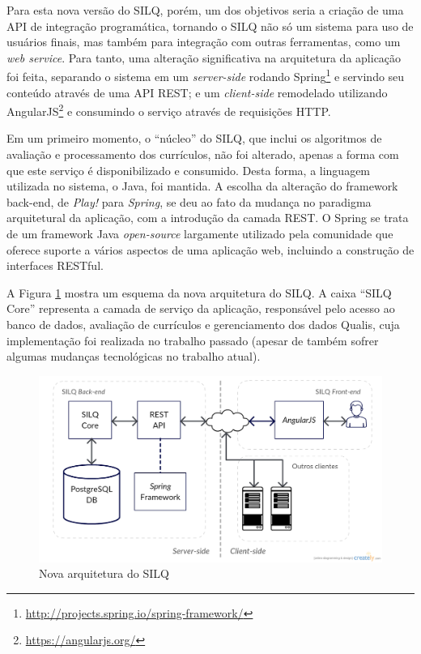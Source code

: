 \documentclass[12pt]{article}
\newcommand{\quotes}[1]{``#1''}
\begin{document}
Para esta nova versão do SILQ, porém, um dos objetivos seria a criação de uma API de integração programática, tornando o SILQ não só um sistema para uso de usuários finais, mas também para integração com outras ferramentas, como um \textit{web service}. Para tanto, uma alteração significativa na arquitetura da aplicação foi feita, separando o sistema em um \textit{server-side} rodando Spring\footnote{\url{http://projects.spring.io/spring-framework/}} e servindo seu conteúdo através de uma API REST; e um \textit{client-side} remodelado utilizando AngularJS\footnote{\url{https://angularjs.org/}} e consumindo o serviço através de requisições HTTP.

Em um primeiro momento, o \quotes{núcleo} do SILQ, que inclui os algoritmos de avaliação e processamento dos currículos, não foi alterado, apenas a forma com que este serviço é disponibilizado e consumido. Desta forma, a linguagem utilizada no sistema, o Java, foi mantida. A escolha da alteração do framework back-end, de \textit{Play!} para \textit{Spring}, se deu ao fato da mudança no paradigma arquitetural da aplicação, com a introdução da camada REST. O Spring se trata de um framework Java \textit{open-source} largamente utilizado pela comunidade que oferece suporte a vários aspectos de uma aplicação web, incluindo a construção de interfaces RESTful.

A Figura \ref{fig:arquitetura} mostra um esquema da nova arquitetura do SILQ. A caixa \quotes{SILQ Core} representa a camada de serviço da aplicação, responsável pelo acesso ao banco de dados, avaliação de currículos e gerenciamento dos dados Qualis, cuja implementação foi realizada no trabalho passado (apesar de também sofrer algumas mudanças tecnológicas no trabalho atual).

\begin{figure}[!h]
   \centering
   \caption{Nova arquitetura do SILQ}
   \label{fig:arquitetura}
   \includegraphics[width=\textwidth]{../figuras/arquitetura-silq.png}
\end{figure}
\end{document}
